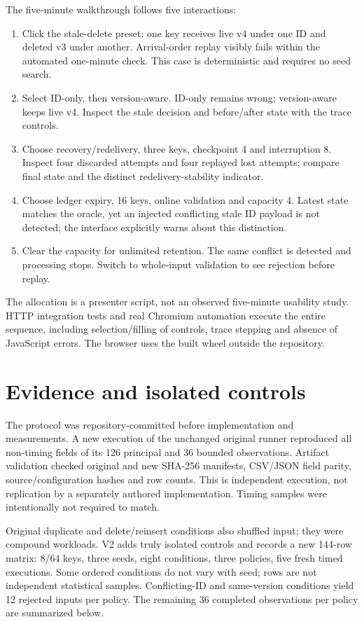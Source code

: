 \documentclass[sigconf,9pt,review]{acmart}
\begin{document}
The five-minute walkthrough follows five interactions:
\begin{enumerate}
\item Click the stale-delete preset: one key receives live v4 under one ID and deleted
v3 under another. Arrival-order replay visibly fails within the automated one-minute
check. This case is deterministic and requires no seed search.
\item Select ID-only, then version-aware. ID-only remains wrong; version-aware keeps
live v4. Inspect the stale decision and before/after state with the trace controls.
\item Choose recovery/redelivery, three keys, checkpoint 4 and interruption 8.
Inspect four discarded attempts and four replayed lost attempts; compare final state
and the distinct redelivery-stability indicator.
\item Choose ledger expiry, 16 keys, online validation and capacity 4. Latest state
matches the oracle, yet an injected conflicting stale ID payload is not detected;
the interface explicitly warns about this distinction.
\item Clear the capacity for unlimited retention. The same conflict is detected and
processing stops. Switch to whole-input validation to see rejection before replay.
\end{enumerate}
The allocation is a presenter script, not an observed five-minute usability study.
HTTP integration tests and real Chromium automation execute the entire sequence,
including selection/filling of controls, trace stepping and absence of JavaScript
errors. The browser uses the built wheel outside the repository.

\section{Evidence and isolated controls}
The protocol was repository-committed before implementation and measurements.
A new execution of the unchanged original runner reproduced all non-timing fields
of its 126 principal and 36 bounded observations. Artifact validation checked original
and new SHA-256 manifests, CSV/JSON field parity, source/configuration hashes and
row counts. This is independent execution, not replication by a separately authored
implementation. Timing samples were intentionally not required to match.

Original duplicate and delete/reinsert conditions also shuffled input; they were
compound workloads. V2 adds truly isolated controls and records a new 144-row matrix:
8/64 keys, three seeds, eight conditions, three policies, five fresh timed executions.
Some ordered conditions do not vary with seed; rows are not independent statistical
samples. Conflicting-ID and same-version conditions yield 12 rejected inputs per
policy. The remaining 36 completed observations per policy are summarized below.
\end{document}
